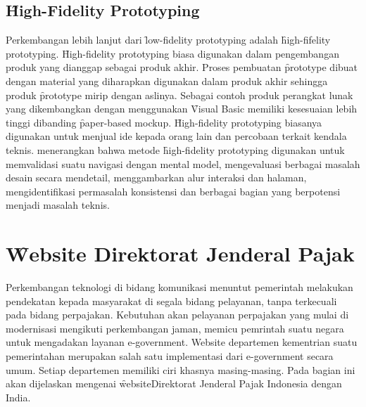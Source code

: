 \subsection{\f{High-Fidelity Prototyping}}
Perkembangan lebih lanjut dari \f{low-fidelity prototyping} adalah \f{high-fifelity prototyping}. \f{High-fidelity prototyping} biasa digunakan dalam pengembangan produk yang dianggap sebagai produk akhir. Proses pembuatan \f{prototype} dibuat dengan material yang diharapkan digunakan dalam produk akhir sehingga produk \f{prototype} mirip dengan aslinya. Sebagai contoh produk perangkat lunak yang dikembangkan dengan menggunakan \f{Visual Basic} memiliki kesesuaian lebih tinggi dibanding \f{paper-based mockup}. \f{High-fidelity prototyping} biasanya digunakan untuk menjual ide kepada orang lain dan percobaan terkait kendala teknis. \citet{buku.dyahningrum} menerangkan bahwa metode \f{high-fidelity prototyping} digunakan untuk memvalidasi suatu navigasi dengan mental model, mengevaluasi berbagai masalah desain secara mendetail, menggambarkan alur interaksi dan halaman, mengidentifikasi permasalah konsistensi dan berbagai bagian yang berpotensi menjadi masalah teknis.
\section{\f{Website} Direktorat Jenderal Pajak}
Perkembangan teknologi di bidang komunikasi menuntut pemerintah melakukan pendekatan kepada masyarakat di segala bidang pelayanan, tanpa terkecuali pada bidang perpajakan. Kebutuhan akan pelayanan perpajakan yang mulai di modernisasi mengikuti perkembangan jaman, memicu pemrintah suatu negara untuk mengadakan layanan e-government. Website departemen kementrian suatu pemerintahan merupakan salah satu implementasi dari e-government secara umum. Setiap departemen memiliki ciri khasnya masing-masing. Pada bagian ini akan dijelaskan mengenai \f{website}Direktorat Jenderal Pajak Indonesia dengan India.
